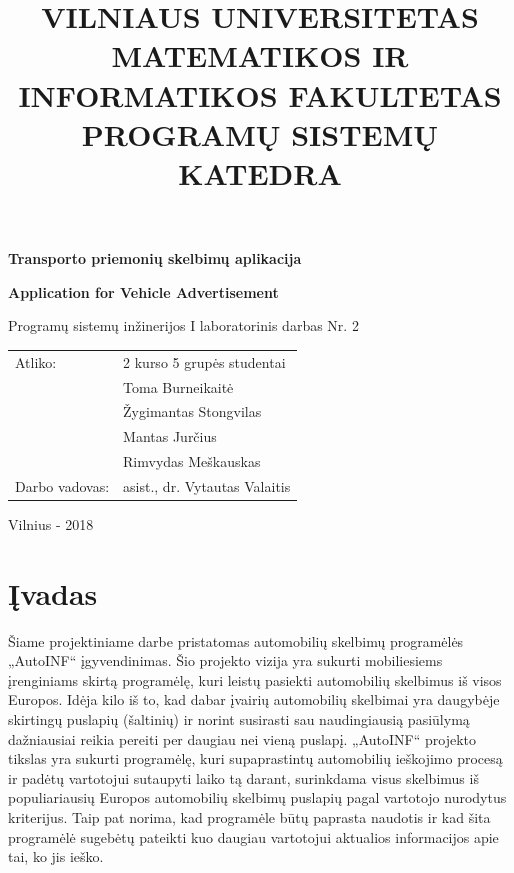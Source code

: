 \documentclass[12pt]{article}
\title{VILNIAUS UNIVERSITETAS \\
MATEMATIKOS IR INFORMATIKOS FAKULTETAS \\
PROGRAMŲ SISTEMŲ KATEDRA}
\author{}
\date{}
\renewcommand{\baselinestretch}{1.5}
\begin{document}
	\clearpage
	\maketitle
	\thispagestyle{empty}

	\bigbreak
	\bigbreak
	\bigbreak
	\bigbreak

	\begin{center}
		\begin{Large}
			\textbf{Transporto priemonių skelbimų aplikacija} \\
		\end{Large}
		\begin{large}
			\textbf{Application for Vehicle Advertisement} \\
		\end{large}
		Programų sistemų inžinerijos I laboratorinis darbas Nr. 2 \\

		\bigbreak
		\bigbreak
		\bigbreak
		\bigbreak
		\bigbreak
		\bigbreak
		\bigbreak
		\bigbreak
		\bigbreak

		\begin{tabular}{ll}
			Atliko:        & 2 kurso 5 grupės studentai \\
		               	   & Toma Burneikaitė \\
		               	   & Žygimantas Stongvilas \\
		                   & Mantas Jurčius \\
		                   & Rimvydas Meškauskas \\
			Darbo vadovas: & asist., dr. Vytautas Valaitis
		\end{tabular}

		\bigbreak
		\bigbreak
		\bigbreak
		\bigbreak
		\bigbreak
		\bigbreak
		\bigbreak
		\bigbreak
		\bigbreak

		Vilnius - 2018
	\end{center}
	\pagebreak
	
	\renewcommand{\baselinestretch}{0.5}
	\tableofcontents
	\renewcommand{\baselinestretch}{1.5}
	\pagebreak	
	
	\section*{Įvadas}	
	
	Šiame projektiniame darbe pristatomas automobilių skelbimų programėlės „AutoINF“ įgyvendinimas. Šio projekto vizija yra sukurti mobiliesiems įrenginiams skirtą programėlę, kuri leistų pasiekti automobilių skelbimus iš visos Europos. Idėja kilo iš to, kad dabar įvairių automobilių skelbimai yra daugybėje skirtingų puslapių (šaltinių) ir norint susirasti sau naudingiausią pasiūlymą dažniausiai reikia pereiti per daugiau nei vieną puslapį. „AutoINF“ projekto tikslas yra sukurti programėlę, kuri supaprastintų automobilių ieškojimo procesą ir padėtų vartotojui sutaupyti laiko tą darant, surinkdama visus skelbimus iš populiariausių Europos automobilių skelbimų puslapių pagal vartotojo nurodytus kriterijus. Taip pat norima, kad programėle būtų paprasta naudotis ir kad šita programėlė sugebėtų pateikti kuo daugiau vartotojui aktualios informacijos apie tai, ko jis ieško.
	\pagebreak
	
\end{document}
